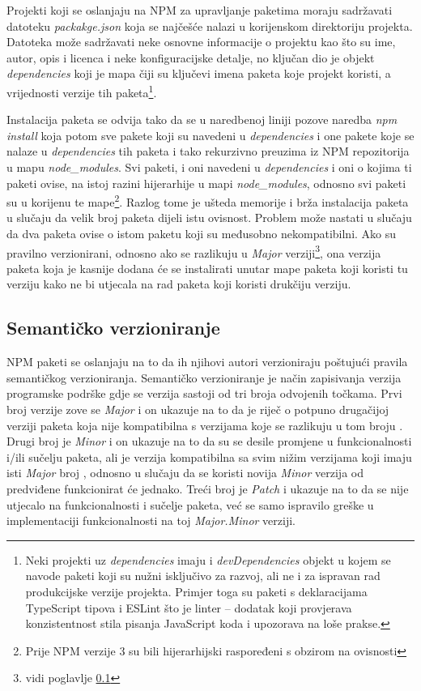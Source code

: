 \documentclass[times, utf8, diplomski, numeric]{fer}
\newcommand{\razmakp}{\vspace{18pt}}
\begin{document}
\razmakp

Projekti koji se oslanjaju na NPM za upravljanje paketima moraju sadržavati datoteku \emph{packakge.json} koja se najčešće nalazi u korijenskom direktoriju projekta.
Datoteka može sadržavati neke osnovne informacije o projektu kao što su ime, autor, opis i licenca i neke konfiguracijske detalje, no ključan dio je objekt \emph{dependencies} koji je mapa čiji su ključevi imena paketa koje projekt koristi, a vrijednosti verzije tih paketa\footnote{
    Neki projekti uz \emph{dependencies} imaju i \emph{devDependencies} objekt u kojem se navode paketi koji su nužni isključivo za razvoj, ali ne i za ispravan rad produkcijske verzije projekta. Primjer toga su paketi s deklaracijama TypeScript tipova i ESLint što je linter – dodatak koji provjerava konzistentnost stila pisanja JavaScript koda i upozorava na loše prakse.
}.

Instalacija paketa se odvija tako da se u naredbenoj liniji pozove naredba \emph{npm install} koja potom sve pakete koji su navedeni u \emph{dependencies} i one pakete koje se nalaze u \emph{dependencies} tih paketa i tako rekurzivno preuzima iz NPM repozitorija u mapu \emph{node\_modules}\citep{npm_docs}.
Svi paketi, i oni navedeni u \emph{dependencies} i oni o kojima ti paketi ovise, na istoj razini hijerarhije u mapi \emph{node\_modules}, odnosno svi paketi su u korijenu te mape\footnote{Prije NPM verzije 3 su bili hijerarhijski raspoređeni s obzirom na ovisnosti}.
Razlog tome je ušteda memorije i brža instalacija paketa u slučaju da velik broj paketa dijeli istu ovisnost.
Problem može nastati u slučaju da dva paketa ovise o istom paketu koji su međusobno nekompatibilni.
Ako su pravilno verzionirani, odnosno ako se razlikuju u \emph{Major} verziji\footnote{vidi poglavlje \ref{sec:semver}}, ona verzija paketa koja je kasnije dodana će se instalirati unutar mape paketa koji koristi tu verziju kako ne bi utjecala na rad paketa koji koristi drukčiju verziju\citep{npm_npm3}.

\subsection{Semantičko verzioniranje} \label{sec:semver}

NPM paketi se oslanjaju na to da ih njihovi autori verzioniraju poštujući pravila semantičkog verzioniranja.
Semantičko verzioniranje je način zapisivanja verzija programske podrške gdje se verzija sastoji od tri broja odvojenih točkama.
Prvi broj verzije zove se \emph{Major} i on ukazuje na to da je riječ o potpuno drugačijoj verziji paketa koja nije kompatibilna s verzijama koje se razlikuju u tom broju .
Drugi broj je \emph{Minor} i on ukazuje na to da su se desile promjene u funkcionalnosti i/ili sučelju paketa, ali je verzija kompatibilna sa svim nižim verzijama koji imaju isti \emph{Major} broj , odnosno u slučaju da se koristi novija \emph{Minor} verzija od predviđene funkcionirat će jednako.
Treći broj je \emph{Patch} i ukazuje na to da se nije utjecalo na funkcionalnosti i sučelje paketa, već se samo ispravilo greške u implementaciji funkcionalnosti na toj \emph{Major.Minor} verziji\citep{semver}.
\end{document}
